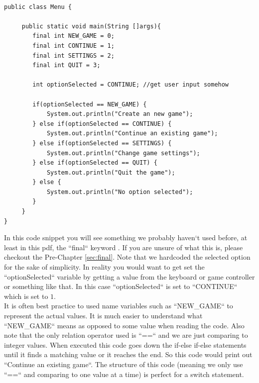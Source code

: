 \documentclass[11]{article}
\begin{document}
\begin{lstlisting}

public class Menu {

     public static void main(String []args){
        final int NEW_GAME = 0;
        final int CONTINUE = 1;
        final int SETTINGS = 2;
        final int QUIT = 3;
        
        int optionSelected = CONTINUE; //get user input somehow
        
        if(optionSelected == NEW_GAME) {
            System.out.println("Create an new game");
        } else if(optionSelected == CONTINUE) {
            System.out.println("Continue an existing game");
        } else if(optionSelected == SETTINGS) {
            System.out.println("Change game settings");
        } else if(optionSelected == QUIT) {
            System.out.println("Quit the game");
        } else {
            System.out.println("No option selected");
        }
     }
}
\end{lstlisting}
In this code snippet you will see something we probably haven`t used before, at least in this pdf, the ``final`` keyword . If you are unsure of what this is, please checkout the Pre-Chapter \autoref{sec:final}. Note that we hardcoded the selected option for the sake of simplicity. In reality you would want to get set the  ``optionSelected`` variable by getting a value from the keyboard or game controller or something like that. In this case ``optionSelected`` is set to ``CONTINUE`` which is set to $1$. \\ 

It is often best practice to used name variables such as ``NEW{\_}GAME`` to represent the actual values. It is much easier to understand what ``NEW{\_}GAME`` means as opposed to some value when reading the code. Also note that the only relation operator used is ``==`` and we are just comparing to integer values. When executed this code goes down the if-else if-else statements until it finds a matching value or it reaches the end. So this code would print out ``Continue an existing game``.  The structure of this code (meaning we only use ``==`` and comparing to one value at a time) is perfect for a switch statement.\\
\end{document}
